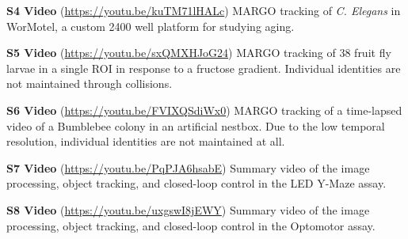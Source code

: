 \documentclass[10pt,letterpaper]{article}
\begin{document}
\noindent
\textbf{S4 Video} (\href{https://youtu.be/kuTM71lHALc}{\color{blue}https://youtu.be/kuTM71lHALc}) MARGO tracking of \textit{C. Elegans} in WorMotel, a custom 2400 well platform for studying aging.
\newline

\noindent
\textbf{S5 Video} (\href{https://youtu.be/sxQMXHJoG24}{\color{blue}https://youtu.be/sxQMXHJoG24}) MARGO tracking of 38 fruit fly larvae in a single ROI in response to a fructose gradient. Individual identities are not maintained through collisions.
\newline

\noindent
\textbf{S6 Video} (\href{https://youtu.be/FVIXQSdiWx0}{\color{blue}https://youtu.be/FVIXQSdiWx0}) MARGO tracking of a time-lapsed video of a Bumblebee colony in an artificial nestbox. Due to the low temporal resolution, individual identities are not maintained at all.
\newline

\noindent
\textbf{S7 Video} (\href{https://youtu.be/PqPJA6hsabE}{\color{blue}https://youtu.be/PqPJA6hsabE}) Summary video of the image processing, object tracking, and closed-loop control in the LED Y-Maze assay.
\newline

\noindent
\textbf{S8 Video} (\href{https://youtu.be/uxgswI8jEWY}{\color{blue}https://youtu.be/uxgswI8jEWY}) Summary video of the image processing, object tracking, and closed-loop control in the Optomotor assay.
\newline

\nolinenumbers

%
%
% 
\end{document}
